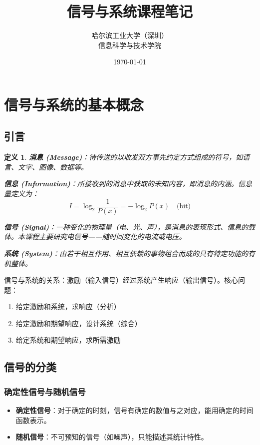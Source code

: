\documentclass[11pt,a4paper]{ctexart}
\title{\bfseries 信号与系统\quad 课程笔记}
\author{哈尔滨工业大学（深圳）\\ 信息科学与技术学院}
\date{\today}
\newtheorem{definition}{定义}[section]
\begin{document}
\maketitle
\tableofcontents
\newpage

\section{信号与系统的基本概念}

\subsection{引言}

\begin{definition}
\textbf{消息 (Message)}：待传送的以收发双方事先约定方式组成的符号，如语言、文字、图像、数据等。

\textbf{信息 (Information)}：所接收到的消息中获取的未知内容，即消息的内涵。信息量定义为：
\[
I = \log_2 \frac{1}{P(x)} = -\log_2 P(x) \quad \text{(bit)}
\]

\textbf{信号 (Signal)}：一种变化的物理量（电、光、声），是消息的表现形式、信息的载体。本课程主要研究电信号——随时间变化的电流或电压。

\textbf{系统 (System)}：由若干相互作用、相互依赖的事物组合而成的具有特定功能的有机整体。
\end{definition}

信号与系统的关系：激励（输入信号）经过系统产生响应（输出信号）。核心问题：
\begin{enumerate}
    \item 给定激励和系统，求响应（分析）
    \item 给定激励和期望响应，设计系统（综合）
    \item 给定系统和期望响应，求所需激励
\end{enumerate}

\subsection{信号的分类}

\subsubsection{确定性信号与随机信号}
\begin{itemize}
    \item \textbf{确定性信号}：对于确定的时刻，信号有确定的数值与之对应，能用确定的时间函数表示。
    \item \textbf{随机信号}：不可预知的信号（如噪声），只能描述其统计特性。
\end{itemize}
\end{document}
